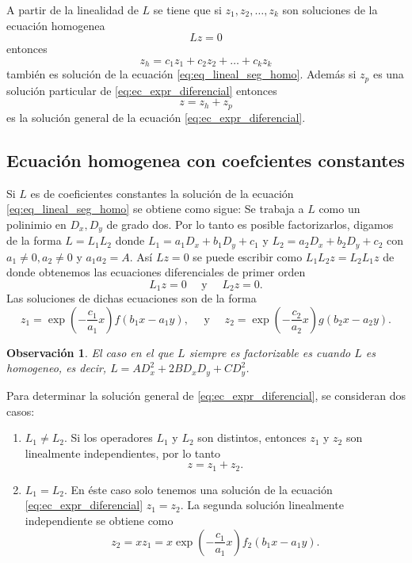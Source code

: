 \documentclass[11pt,letterpaper,draft]{report}
\newtheorem{obs}[defn]{Observación}
\newcommand\<{\langle}
\renewcommand\>{\rangle}
\begin{document}
A partir de la linealidad de $L$ se tiene que si
$z_1,z_2,\ldots,z_k$ son soluciones de la ecuación homogenea
\begin{equation}
  \label{eq:eq_lineal_seg_homo}
  Lz = 0
\end{equation}
entonces 
\[
z_h = c_1 z_1 + c_2 z_2 + \ldots + c_k z_k
\] 
también es solución de la ecuación \ref{eq:eq_lineal_seg_homo}.
Además si $z_p$ es una solución particular de
\ref{eq:ec_expr_diferencial} entonces
\[
z = z_h + z_p
\] 
es la solución general de la ecuación
\ref{eq:ec_expr_diferencial}.

\subsection{Ecuación homogenea con coefcientes constantes}

Si $L$ es de coeficientes constantes la solución de la
ecuación \ref{eq:eq_lineal_seg_homo} se obtiene como sigue:
Se trabaja a $L$ como un polinimio en $D_x, D_y$ de grado
dos. Por lo tanto es posible factorizarlos, digamos de la
forma $L = L_1 L_2$ donde $L_1 = a_1 D_x + b_1 D_y + c_1$ y
$L_2 = a_2 D_x + b_2 D_y + c_2$ con $a_1 \neq 0, a_2 \neq
0$ y $a_1 a_2 = A$. Así $L z = 0$ se puede escribir como
$L_1 L_2 z = L_2 L_1 z$ de donde obtenemos las ecuaciones
diferenciales de primer orden
\[
L_1 z = 0 \quad \text{ y } \quad L_2 z = 0.
\] 
Las soluciones de dichas ecuaciones son de la forma
\[
z_1 = \exp\left(-\frac{c_1}{a_1} x\right) f(b_1x-a_1y),
\quad \text{ y } \quad z_2 = \exp\left(-\frac{c_2}{a_2}
  x\right) g(b_2x - a_2y).
\] 
\begin{obs}
  El caso en el que $L$ siempre es factorizable es cuando $L$
  es homogeneo, es decir, $L = AD_x^2 + 2BD_xD_y + CD_y^2$. 
\end{obs}
Para determinar la solución general de
\ref{eq:ec_expr_diferencial}, se consideran dos casos:
\begin{enumerate}
  \item $L_1 \neq L_2$. Si los operadores $L_1$ y $L_2$ son
    distintos, entonces $z_1$ y $z_2$ son linealmente
    independientes, por lo tanto
    \[
    z = z_1 + z_2.
    \] 
  \item $L_1 = L_2$. En éste caso solo tenemos una solución
    de la ecuación \ref{eq:ec_expr_diferencial} $z_1 = z_2$.
    La segunda solución linealmente independiente se obtiene
    como
    \[
    z_2 = x z_1 = x \exp\left(-\frac{c_1}{a_1} x\right)
    f_2(b_1x - a_1y).
    \] 
\end{enumerate}
\end{document}
